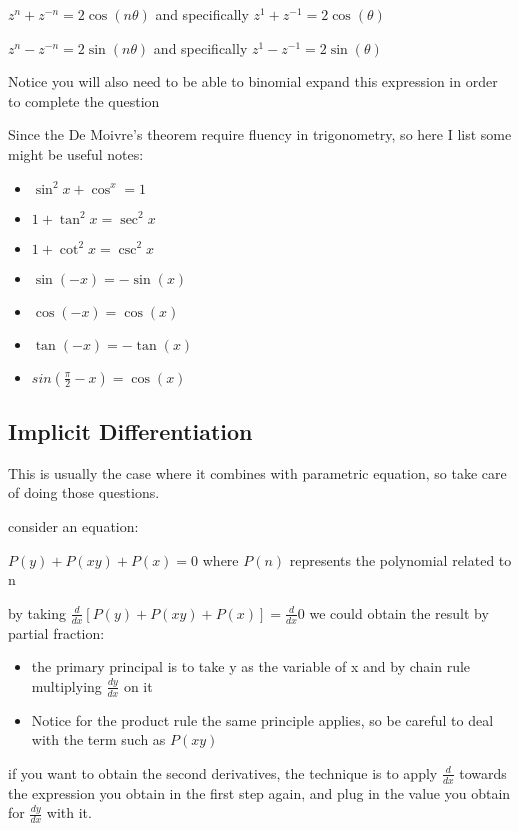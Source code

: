 \documentclass[]{article}
\begin{document}
\(z^n + z^{-n} = 2\cos(n\theta)\) and specifically
\(z^1 + z^{-1} = 2\cos(\theta)\)

\(z^n - z^{-n} = 2\sin(n\theta)\) and specifically
\(z^1 - z^{-1} = 2\sin(\theta)\)

Notice you will also need to be able to binomial expand this expression
in order to complete the question

Since the De Moivre's theorem require fluency in trigonometry, so here I
list some might be useful notes:

\begin{itemize}
\item
  \(\sin^2x + \cos^x = 1\)
\item
  \(1 + \tan^2x = \sec^2x\)
\item
  \(1+\cot^2x = \csc^2x\)
\item
  \(\sin(-x) = -\sin(x)\)
\item
  \(\cos(-x) = \cos(x)\)
\item
  \(\tan(-x) = -\tan(x)\)
\item
  \(sin(\frac{\pi}{2} - x) = \cos(x)\) 
\end{itemize}

\subsection{Implicit Differentiation}\label{header-n902}

This is usually the case where it combines with parametric equation, so
take care of doing those questions.

consider an equation:

\(P(y) + P(xy) + P(x) = 0\) where \(P(n)\) represents the polynomial
related to n

by taking \(\frac{d}{dx}[P(y) + P(xy) + P(x) ] = \frac{d}{dx}0\) we
could obtain the result by partial fraction:

\begin{itemize}
\item
  the primary principal is to take y as the variable of x and by chain
  rule multiplying \(\frac{dy}{dx}\) on it
\item
  Notice for the product rule the same principle applies, so be careful
  to deal with the term such as \(P(xy)\)
\end{itemize}

if you want to obtain the second derivatives, the technique is to apply
\(\frac{d}{dx}\) towards the expression you obtain in the first step
again, and plug in the value you obtain for \(\frac{dy}{dx}\) with it.
\end{document}
